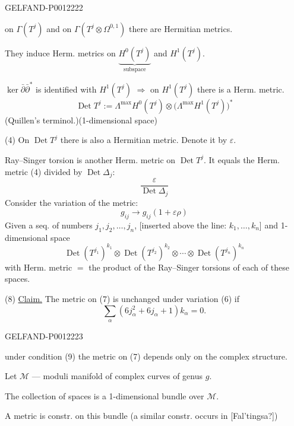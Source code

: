 \begin{GelfandAdjacentEvidence}{GELFAND-P001222}{2}


on \(\Gamma(T^j)\) and on \(\Gamma(T^j\otimes\Omega^{0,1})\)
there are Hermitian metrics.

They induce Herm. metrics on \(\underbrace{H^0(T^j)}_{\text{subspace}}\) and \(H^1(T^j)\).

\(\ker\bar\partial\bar\partial^*\) is identified with \(H^1(T^j)\)
\(\Rightarrow\) on \(H^1(T^j)\) there is a Herm. metric.
\begin{equation*}
\operatorname{Det}T^j:=\Lambda^{\max}H^0(T^j)
\otimes\bigl(\Lambda^{\max}H^1(T^j)\bigr)^*\tag{3}
\end{equation*}
(Quillen's terminol.)\qquad(1-dimensional space)

(4) On \(\operatorname{Det}T^j\) there is also a Hermitian metric. Denote it by \(\varepsilon\).

Ray--Singer torsion is another Herm. metric on \(\operatorname{Det}T^j\). It equals the Herm. metric (4) divided by \(\operatorname{Det}\Delta_j\):
\begin{equation*}
\frac{\varepsilon}{\operatorname{Det}\Delta_j}\tag{5}
\end{equation*}
Consider the variation of the metric:
\begin{equation*}
g_{ij}\longrightarrow g_{ij}(1+\varepsilon\rho)\tag{6}
\end{equation*}
Given a seq. of numbers \(j_1,j_2,\ldots,j_n\),
[inserted above the line: \(k_1,\ldots,k_n\)] and 1-dimensional space
\begin{equation*}
\operatorname{Det}(T^{j_1})^{k_1}\otimes
\operatorname{Det}(T^{j_2})^{k_2}\otimes\cdots\otimes
\operatorname{Det}(T^{j_n})^{k_n}\tag{7}
\end{equation*}
with Herm. metric \(=\) the product of the Ray--Singer torsions of each of these spaces.

(8) \underline{Claim.} The metric on (7) is unchanged under variation (6) if
\begin{equation*}
\sum_\alpha(6j_\alpha^2+6j_\alpha+1)k_\alpha=0.\tag{9}
\end{equation*}
\end{GelfandAdjacentEvidence}
\begin{GelfandAdjacentEvidence}{GELFAND-P001222}{3}


 under condition (9) the metric on (7) depends only on the complex structure.

Let \(\mathcal M\) --- moduli manifold of complex curves of genus \(g\).

The collection of spaces is a 1-dimensional bundle over \(\mathcal M\).

A metric is constr. on this bundle (a similar constr. occurs in [Fal'tingsa?])
\end{GelfandAdjacentEvidence}
